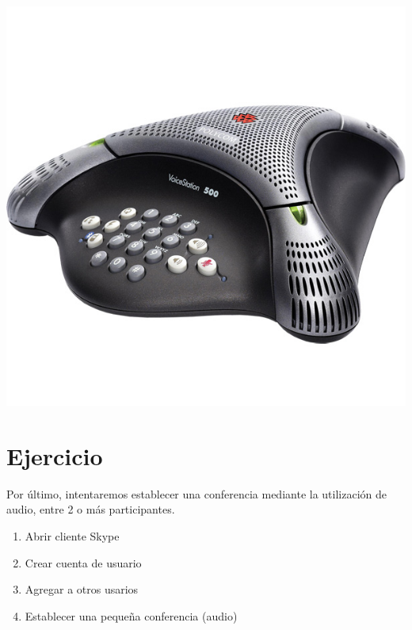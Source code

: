 \documentclass[letter, 10pt]{article}
\begin{document}
\includegraphics[scale=0.4]{img/voicestation}

\section{Ejercicio}

Por último, intentaremos establecer una conferencia mediante la utilización de audio, entre 2 o más participantes.

\begin{enumerate}
	\item Abrir cliente Skype
	\item Crear cuenta de usuario
	\item Agregar a otros usarios
	\item Establecer una pequeña conferencia (audio)
\end{enumerate}
\end{document}
